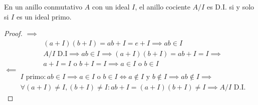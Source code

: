 \begin{thm}
    En un anillo conmutativo $A$ con un ideal $I$, el anillo cociente $A / I$ es D.I. si y solo si $I$ es un ideal primo.
\end{thm}

\begin{proof}
    $\implies$
    \begin{equation}
        \begin{split}
            & (a+I)(b+I) = ab + I = e + I \implies ab \in I\\
            & A / I \text{ D.I} \implies ab \in I \implies (a + I)(b + I) = ab + I = I \implies\\
            & a + I = I \text{ o } b + I = I \implies a \in I \text{ o } b \in I
        \end{split}
    \end{equation}
    $\impliedby$
    \begin{equation}
        \begin{split}
            & I \text{ primo} : ab \in I \implies a \in I \text{ o } b \in I \iff a \not\in I \text{ y } b \not\in I \implies ab \not\in I \implies\\
            & \forall (a + I) \neq I, (b + I) \neq I : ab + I = (a +I)(b + I) \neq I \implies A / I \text{ D.I.}
        \end{split}
    \end{equation}    
\end{proof}
